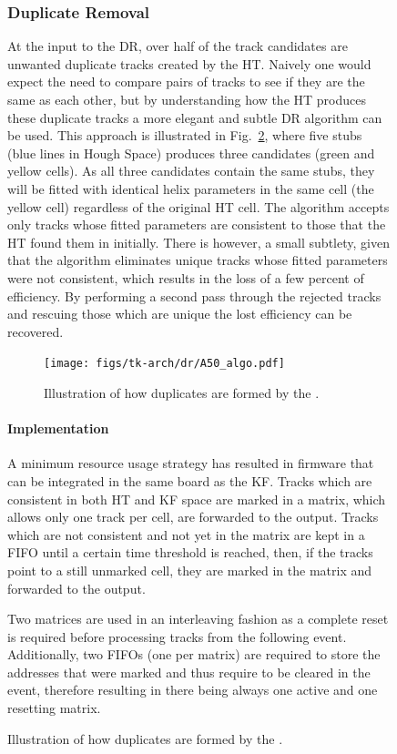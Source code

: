 \begin{figure}[tb]
\subsubsection{Duplicate Removal}
At the input to the DR, over half of the track candidates are unwanted duplicate tracks created by the HT.
Naively one would expect the need to compare pairs of tracks to see if they are the same as each other, but by understanding how the HT produces these duplicate tracks a more elegant and subtle DR algorithm can be used.
This approach is illustrated in Fig.~\ref{fig:DR}, where five stubs (blue lines in Hough Space) produces three candidates (green and yellow cells).
As all three candidates contain the same stubs, they will be fitted with identical helix parameters in the same cell (the yellow cell) regardless of the original HT cell.
The algorithm accepts only tracks whose fitted parameters are consistent to those that the HT found them in initially. There is however, a small subtlety, given that the algorithm eliminates unique tracks whose fitted parameters were not consistent, which results in the loss of a few percent of efficiency. 
By performing a second pass through the rejected tracks and rescuing those which are unique the lost efficiency can be recovered.

\begin{figure}[!h]
\centering
\texttt{[image: figs/tk-arch/dr/A50\_algo.pdf]}
\caption{Illustration of how duplicates are formed by the \rphi \HT.}
\label{fig:DR}
\end{figure}

\paragraph{Implementation}
A minimum resource usage strategy has resulted in firmware that can be integrated in the same board as the KF.
Tracks which are consistent in both HT and KF space are marked in a matrix, which allows only one track per cell, are forwarded to the output.
Tracks which are not consistent and not yet in the matrix are kept in a FIFO until a certain time threshold is reached, then, if the tracks point to a still unmarked cell, they are marked in the matrix and forwarded to the output. 

Two matrices are used in an interleaving fashion as a complete reset is required before processing tracks from the following event.
Additionally, two FIFOs (one per matrix) are required to store the addresses that were marked and thus require to be cleared in the event, therefore resulting in there being always one active and one resetting matrix.


\end{figure}
